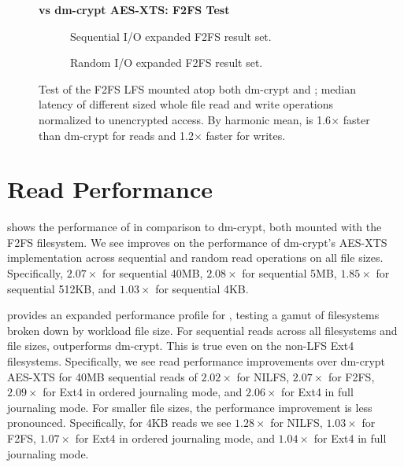 \begin{figure}[ht]
    \textbf{\SYSTEM{} vs dm-crypt AES-XTS: F2FS Test}\par\medskip
    \centering
    \begin{subfigure}{0.5\linewidth}
        \centering
        {}
        \caption{Sequential I/O expanded F2FS result set.}
        \label{fig:microbench-f2fs-sequential}
    \end{subfigure}\hspace*{0.5em}%
    \begin{subfigure}{0.5\linewidth}
        \centering
        \vspace{2em}
        {}
        \caption{Random I/O expanded F2FS result set.}
        \label{fig:microbench-f2fs-random}
    \end{subfigure}
    \caption{Test of the F2FS LFS mounted atop both dm-crypt and
      \SYSTEM{}; median latency of different sized whole file read and
      write operations normalized to unencrypted access. By harmonic
      mean, \SYSTEM{} is 1.6$\times$ faster than dm-crypt for reads
      and 1.2$\times$ faster for writes.}
    \label{fig:microbench-f2fs}
\end{figure}

\section{\SYSTEM{} Read Performance}

 shows the performance of \SYSTEM{} in comparison to
dm-crypt, both mounted with the F2FS filesystem. We see \SYSTEM{} improves on
the performance of dm-crypt's AES-XTS implementation across sequential and
random read operations on all file sizes. Specifically, $2.07\times$ for
sequential 40MB, $2.08\times$ for sequential 5MB, $1.85\times$ for sequential
512KB, and $1.03\times$ for sequential 4KB.

 provides an expanded performance profile for
\SYSTEM{}, testing a gamut of filesystems broken down by workload file size. For
sequential reads across all filesystems and file sizes, \SYSTEM{} outperforms
dm-crypt. This is true even on the non-LFS Ext4 filesystems. Specifically, we
see read performance improvements over dm-crypt AES-XTS for 40MB sequential
reads of $2.02\times$ for NILFS, $2.07\times$ for F2FS, $2.09\times$ for Ext4 in
ordered journaling mode, and $2.06\times$ for Ext4 in full journaling mode. For
smaller file sizes, the performance improvement is less pronounced.
Specifically, for 4KB reads we see $1.28\times$ for NILFS, $1.03\times$ for
F2FS, $1.07\times$ for Ext4 in ordered journaling mode, and $1.04\times$ for
Ext4 in full journaling mode.

